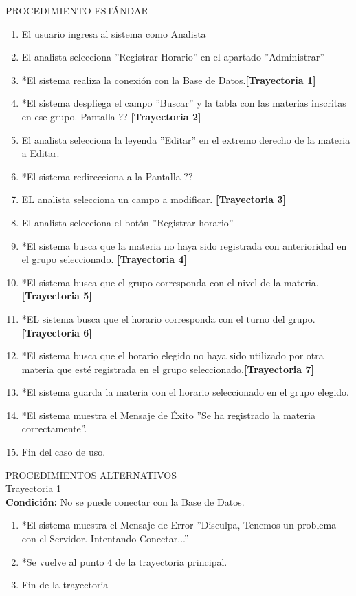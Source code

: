 \vspace*{1cm}
\noindent
\Large{PROCEDIMIENTO ESTÁNDAR}
\large{}
\begin{enumerate}
	\item El usuario ingresa al sistema como Analista
	\item El analista selecciona ''Registrar Horario'' en el apartado ''Administrar''
	\item *El sistema realiza la conexión con la Base de Datos.\textbf{[Trayectoria 1]}
	\item *El sistema despliega el campo ''Buscar'' y la tabla con las materias inscritas en ese grupo. Pantalla ?? \textbf{[Trayectoria 2]}
	\item El analista selecciona la leyenda ''Editar'' en el extremo derecho de la materia a Editar.
	\item *El sistema redirecciona a la Pantalla ??
	\item EL analista selecciona un campo a modificar. \textbf{[Trayectoria 3]}
	\item El analista selecciona el botón ''Registrar horario''
	\item *El sistema busca que la materia no haya sido registrada con anterioridad en el grupo seleccionado. \textbf{[Trayectoria 4]}
	\item *El sistema busca que el grupo corresponda con el nivel de la materia.\textbf{[Trayectoria 5]}
	\item *EL sistema busca que el horario corresponda con el turno del grupo.\textbf{[Trayectoria 6]}
	\item *El sistema busca que el horario elegido no haya sido utilizado por otra materia que esté registrada en el grupo seleccionado.\textbf{[Trayectoria 7]}
	\item *El sistema guarda la materia con el horario seleccionado en el grupo elegido.
	\item *El sistema muestra el Mensaje de Éxito ''Se ha registrado la materia correctamente''.
	\item Fin del caso de uso.
\end{enumerate}
\vspace*{1cm}
\Large{PROCEDIMIENTOS ALTERNATIVOS}\\
	\large{Trayectoria 1}\\
		\textbf{Condición:} No se puede conectar con la Base de Datos.
		\begin{enumerate}
			\item *El sistema muestra el Mensaje de Error ''Disculpa, Tenemos un problema con el Servidor. Intentando Conectar...''
			\item *Se vuelve al punto 4 de la trayectoria principal.
			\item Fin de la trayectoria
		\end{enumerate}
